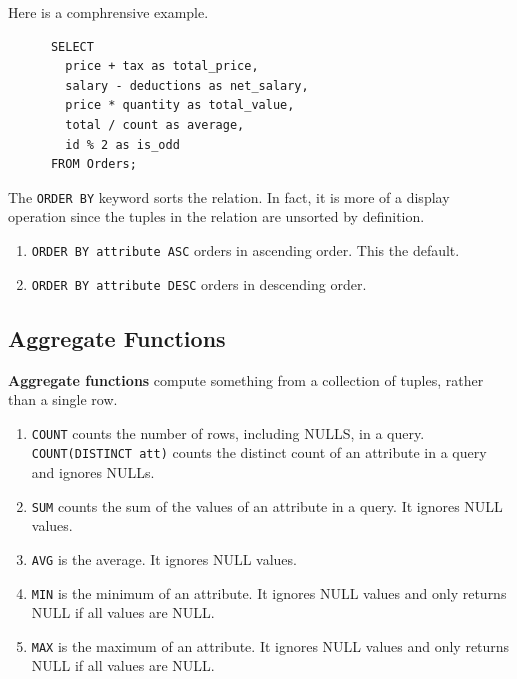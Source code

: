   \begin{example}[Arithmetic]
    Here is a comphrensive example. 
    \begin{lstlisting}
      SELECT 
        price + tax as total_price,
        salary - deductions as net_salary,
        price * quantity as total_value,
        total / count as average,
        id % 2 as is_odd
      FROM Orders; 
    \end{lstlisting}
  \end{example}

  \begin{definition}[Sorting]
    The \texttt{ORDER BY} keyword sorts the relation. In fact, it is more of a display operation since the tuples in the relation are unsorted by definition. 
    \begin{enumerate}
      \item \texttt{ORDER BY attribute ASC} orders in ascending order. This the default. 
      \item \texttt{ORDER BY attribute DESC} orders in descending order.
    \end{enumerate}
  \end{definition}

\subsection{Aggregate Functions} 

    \begin{definition} 
      \textbf{Aggregate functions} compute something from a collection of tuples, rather than a single row. 
      \begin{enumerate}
        \item \texttt{COUNT} counts the number of rows, including NULLS, in a query. \texttt{COUNT(DISTINCT att)} counts the distinct count of an attribute in a query and ignores NULLs. 
        \item \texttt{SUM} counts the sum of the values of an attribute in a query. It ignores NULL values. 
        \item \texttt{AVG} is the average. It ignores NULL values. 
        \item \texttt{MIN} is the minimum of an attribute. It ignores NULL values and only returns NULL if all values are NULL. 
        \item \texttt{MAX} is the maximum of an attribute. It ignores NULL values and only returns NULL if all values are NULL. 
      \end{enumerate}
    \end{definition}


